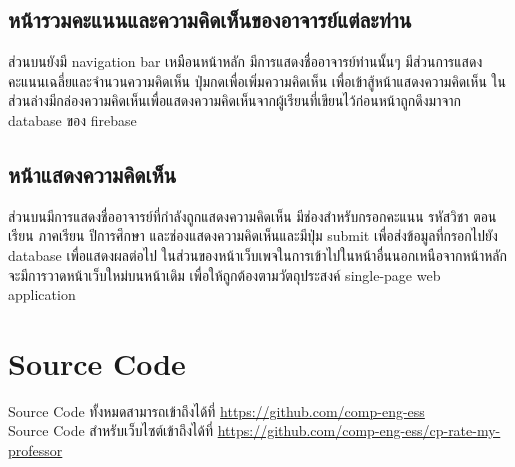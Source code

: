 \documentclass[17pt]{extarticle}
\begin{document}
\subsection{หน้ารวมคะแนนและความคิดเห็นของอาจารย์แต่ละท่าน}

ส่วนบนยังมี navigation bar เหมือนหน้าหลัก มีการแสดงชื่ออาจารย์ท่านนั้นๆ มีส่วนการแสดงคะแนนเฉลี่ยและจำนวนความคิดเห็น ปุ่มกดเพื่อเพิ่มความคิดเห็น เพื่อเข้าสู้หน้าแสดงความคิดเห็น ในส่วนล่างมีกล่องความคิดเห็นเพื่อแสดงความคิดเห็นจากผู้เรียนที่เขียนไว้ก่อนหน้าถูกดึงมาจาก database ของ firebase

\subsection{หน้าแสดงความคิดเห็น}

ส่วนบนมีการแสดงชื่ออาจารย์ที่กำลังถูกแสดงความคิดเห็น มีช่องสำหรับกรอกคะแนน รหัสวิชา ตอนเรียน ภาคเรียน ปีการศึกษา และช่องแสดงความคิดเห็นและมีปุ่ม submit เพื่อส่งข้อมูลที่กรอกไปยัง database เพื่อแสดงผลต่อไป
ในส่วนของหน้าเว็บเพจในการเข้าไปในหน้าอื่นนอกเหนือจากหน้าหลักจะมีการวาดหน้าเว็บใหม่บนหน้าเดิม เพื่อให้ถูกต้องตามวัตถุประสงค์ single-page web application
\section{Source Code}
Source Code ทั้งหมดสามารถเข้าถึงได้ที่ {\color{blue}\url{https://github.com/comp-eng-ess}}\\
Source Code สำหรับเว็บไซต์เข้าถึงได้ที่ {\color{blue}\url{https://github.com/comp-eng-ess/cp-rate-my-professor}}
\pagebreak
\end{document}
